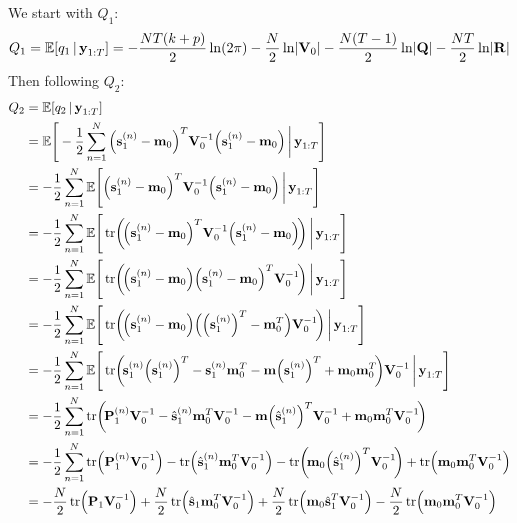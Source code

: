 	We start with \(Q_1\):
	\begin{equation*}
		Q_1 = \mathbb{E}[q_1 \,\vert\, \boldsymbol{\mathrm{y}}_{1:T}] = -\frac{NT(k + p)}{2} \ln(2\pi) - \frac{N}{2} \ln \lvert \boldsymbol{\mathrm{V}}_0 \rvert - \frac{N(T - 1)}{2} \ln \lvert \boldsymbol{\mathrm{Q}} \rvert - \frac{NT}{2} \ln \lvert \boldsymbol{\mathrm{R}} \rvert
	\end{equation*}
	Then following \(Q_2\):
	\begin{align*}
		Q_2
			&= \E[q_2 \given \vec{y}_{1:T}] \\
			&= \E\Bigg[ -\frac{1}{2} \sum_{n = 1}^{N} \Big( \vec{s}_1^{(n)} - \vec{m}_0 \Big)^T \mat{V}_0^{-1} \Big( \vec{s}_1^{(n)} - \vec{m}_0 \Big) \bigggiven \vec{y}_{1:T} \Bigg] \\
			&= -\frac{1}{2} \sum_{n = 1}^{N} \E\Bigg[ \Big( \vec{s}_1^{(n)} - \vec{m}_0 \Big)^T \mat{V}_0^{-1} \Big( \vec{s}_1^{(n)} - \vec{m}_0 \Big) \bigggiven \vec{y}_{1:T} \Bigg] \\
			&= -\frac{1}{2} \sum_{n = 1}^{N} \E\Bigg[ \tr\!\bigg(\!\Big( \vec{s}_1^{(n)} - \vec{m}_0 \Big)^T \mat{V}_0^{-1} \Big( \vec{s}_1^{(n)} - \vec{m}_0 \Big)\!\bigg) \bigggiven \vec{y}_{1:T} \Bigg] \\
			&= -\frac{1}{2} \sum_{n = 1}^{N} \E\Bigg[ \tr\!\bigg(\!\Big( \vec{s}_1^{(n)} - \vec{m}_0 \Big) \Big( \vec{s}_1^{(n)} - \vec{m}_0 \Big)^T \mat{V}_0^{-1} \!\bigg) \bigggiven \vec{y}_{1:T} \Bigg] \\
			&= -\frac{1}{2} \sum_{n = 1}^{N} \E\Bigg[ \tr\!\bigg(\!\Big( \vec{s}_1^{(n)} - \vec{m}_0 \Big) \Big( \Big(\vec{s}_1^{(n)}\Big)^T - \vec{m}_0^T \Big) \mat{V}_0^{-1} \!\bigg) \bigggiven \vec{y}_{1:T} \Bigg] \\
			&= -\frac{1}{2} \sum_{n = 1}^{N} \E\Bigg[ \tr\!\bigg(\! \vec{s}_1^{(n)} \Big(\vec{s}_1^{(n)}\Big)^T - \vec{s}_1^{(n)} \vec{m}_0^T - \vec{m}\Big(\vec{s}_1^{(n)}\Big)^T + \vec{m}_0 \vec{m}_0^T \!\bigg) \mat{V}_0^{-1} \bigggiven \vec{y}_{1:T} \Bigg] \\
			&= -\frac{1}{2} \sum_{n = 1}^{N} \tr\!\bigg(\! \mat{P}_1^{(n)} \mat{V}_0^{-1} - \hat{\vec{s}}_1^{(n)} \vec{m}_0^T \mat{V}_0^{-1} - \vec{m}\Big(\hat{\vec{s}}_1^{(n)}\Big)^T \mat{V}_0^{-1} + \vec{m}_0 \vec{m}_0^T \mat{V}_0^{-1} \!\bigg) \\
			&= -\frac{1}{2} \sum_{n = 1}^{N} \tr\!\Big( \mat{P}_1^{(n)} \mat{V}_0^{-1} \Big) - \tr\!\Big( \hat{\vec{s}}_1^{(n)} \vec{m}_0^T \mat{V}_0^{-1} \Big) - \tr\!\bigg(\! \vec{m}_0 \Big(\hat{\vec{s}}_1^{(n)}\Big)^T \mat{V}_0^{-1} \!\bigg) + \tr\!\Big(\vec{m}_0 \vec{m}_0^T \mat{V}_0^{-1} \Big) \\
			&=  -\frac{N}{2} \tr\!\Big( \mat{P}_1 \mat{V}_0^{-1} \Big) + \frac{N}{2} \tr\!\Big( \hat{\vec{s}}_1 \vec{m}_0^T \mat{V}_0^{-1} \Big) + \frac{N}{2} \tr\!\Big( \vec{m}_0 \hat{\vec{s}}_1^T \mat{V}_0^{-1} \Big) - \frac{N}{2} \tr\!\Big(\vec{m}_0 \vec{m}_0^T \mat{V}_0^{-1} \Big)
	\end{align*}
